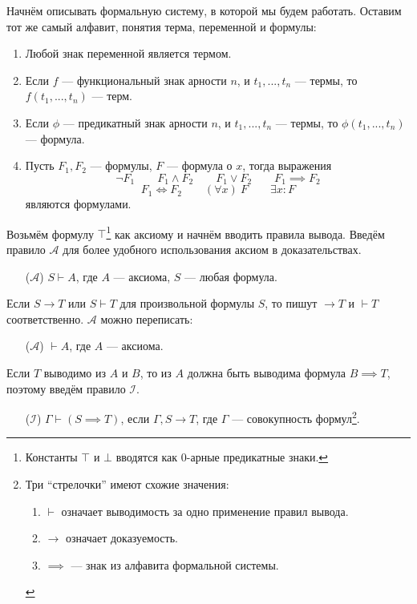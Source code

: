 Начнём описывать формальную систему, в которой мы будем работать.
Оставим тот же самый алфавит, понятия терма, переменной и формулы:
\begin{fullwidth}
  \begin{multicols}{2}
    \begin{enumerate}
      \item{}Любой знак переменной является термом.
      \item{}Если $f$ --- функциональный знак арности $n$, и $t_1,...,t_{n}$ --- термы,
      то $f(t_1,...,t_{n})$ --- терм.
      \item{}Если $\phi$ --- предикатный знак арности $n$, и $t_1,...,t_{n}$ --- термы,
      то $\phi(t_1,...,t_{n})$ --- формула.

      \columnbreak

      \item{}Пусть $F_1,F_2$ --- формулы, $F$ --- формула о $x$, тогда выражения
      \[
        \lnot F_1\qquad F_1\land F_2\qquad F_1\lor F_2\qquad
        F_1\implies F_2
      \]
      \[
        F_1\iff F_2\qquad (\forall x)~F\qquad
        \exists x:F
      \]
      являются формулами.
    \end{enumerate}
  \end{multicols}
\end{fullwidth}

\newcommand\taut{$\mathcal T$}
\newcommand\axiom{$\mathcal A$}
\newcommand\implic{$\mathcal I$}
\newcommand\Px{\mathcal P}
Возьмём формулу $\top$\footnote{Константы $\top$ и $\bot$ вводятся как
  $0$-арные предикатные знаки.}
как аксиому и начнём вводить правила вывода.
Введём правило \axiom{} для более удобного использования аксиом в доказательствах.
\begin{enumerate}
  \item[(\axiom)]{}$S\vdash A$, где $A$ --- аксиома, $S$ --- любая формула.
\end{enumerate}

Если $S\to T$ или $S\vdash T$ для произвольной формулы $S$,
то пишут $\to T$ и $\vdash T$ соответственно. \axiom{} можно переписать:
\begin{enumerate}
  \item[(\axiom)]{}$\vdash A$, где $A$ --- аксиома.\index{правило!\axiom}
\end{enumerate}

Если $T$ выводимо из $A$ и $B$, то из $A$ должна быть выводима формула $B\implies T$,
поэтому введём правило \implic{}.
\begin{enumerate}
  \item[(\implic)]{}${\Gamma\vdash (S\implies T)}$, если $\Gamma,S\to T$,
  \index{правило!\implic}
  где $\Gamma$ --- совокупность формул\footnote[][-2cm]{
    Три ``стрелочки'' имеют схожие значения:
    \begin{enumerate}
      \item{}$\vdash$ означает выводимость за одно применение правил вывода.
      \item{}$\to$ означает доказуемость.
      \item{}$\implies$ --- знак из алфавита формальной системы.
    \end{enumerate}
  }.
\end{enumerate}

